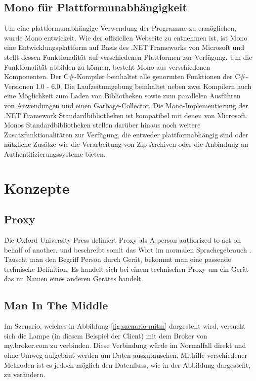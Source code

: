     \subsection{Mono für Plattformunabhängigkeit}
        Um eine plattformunabhängige Verwendung der Programme zu ermöglichen, wurde Mono entwickelt.
        Wie der offiziellen Webseite \cite{mono_project_2018} zu entnehmen ist, ist Mono eine Entwicklungsplattform auf Basis des .NET Frameworks von Microsoft und stellt dessen Funktionalität auf verschiedenen Plattformen zur Verfügung. Um die Funktionalität abbilden zu können, besteht Mono aus verschiedenen Komponenten.
        Der C\#-Kompiler beinhaltet alle genormten Funktionen der C\#-Versionen 1.0 - 6.0.
        Die Laufzeitumgebung beinhaltet neben zwei Kompilern auch eine Möglichkeit zum Laden von Bibliotheken sowie zum parallelen Ausführen von Anwendungen und einen Garbage-Collector.
        Die Mono-Implementierung der .NET Framework Standardbibliotheken ist kompatibel mit denen von Microsoft.
        Monos Standardbibliotheken stellen darüber hinaus noch weitere Zusatzfunktionalitäten zur Verfügung, die entweder plattformabhängig sind oder nützliche Zusätze wie die Verarbeitung von Zip-Archiven oder die Anbindung an Authentifizierungssysteme bieten.

\section{Konzepte} \label{TechKonzepte}
    \subsection{Proxy}
    Die Oxford University Press definiert Proxy als \glqq A person authorized to act on behalf of another.\grqq{} und beschreibt somit das Wort im normalen Sprachegebrauch \cite{oxford_university_press_2019}.
    Tauscht man den Begriff \glqq Person\grqq{} durch \glqq Gerät\grqq{}, bekommt man eine passende technische Definition. Es handelt sich bei einem technischen Proxy um ein Gerät das im Namen eines anderen Gerätes handelt.

    \subsection{Man In The Middle}
        Im Szenario, welches in Abbildung \ref{fig:szenario-mitm} dargestellt wird, versucht sich die Lampe (in diesem Beispiel der Client) mit dem Broker von \glqq my.broker.com\grqq{} zu verbinden. Diese Verbindung würde im Normalfall direkt und ohne Umweg aufgebaut werden um Daten auszutauschen. Mithilfe verschiedener Methoden ist es jedoch möglich den Datenfluss, wie in der Abbildung dargestellt, zu verändern.
        
